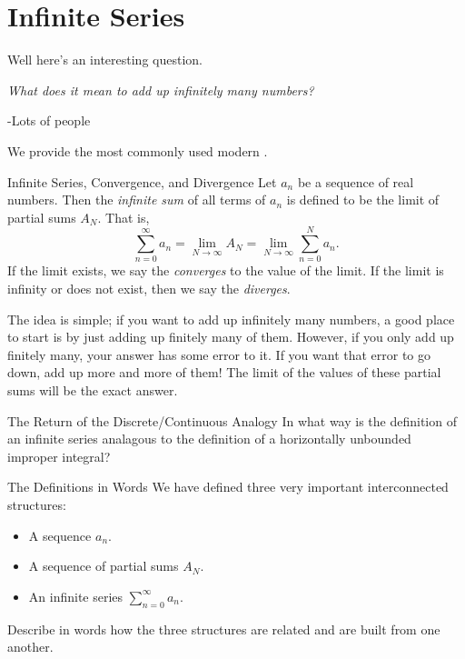 \section{Infinite Series}
Well here's an interesting question.
\begin{center}
\emph{What does it mean to add up infinitely many numbers?}

\parindent \parindent -Lots of people
\end{center}

We provide the most commonly used modern .

\begin{definition}{Infinite Series, Convergence, and Divergence}
Let $a_n$ be a sequence of real numbers.  Then the \emph{infinite sum} of all terms of $a_n$ is defined to be the limit of partial sums $A_N$.  That is, 
$$\sum_{n=0}^\infty a_n = \lim_{N\rightarrow \infty} A_N = \lim_{N\rightarrow \infty} \sum_{n=0}^N a_n. $$
If the limit exists, we say the  \emph{converges} to the value of the limit.  If the limit is infinity or does not exist, then we say the  \emph{diverges}. 
\end{definition}

The idea is simple; if you want to add up infinitely many numbers, a good place to start is by just adding up finitely many of them.  However, if you only add up finitely many, your answer has some error to it.  If you want that error to go down, add up more and more of them!  The limit of the values of these partial sums will be the exact answer.

\begin{exercise}{The Return of the Discrete/Continuous Analogy \Coffeecup \Coffeecup \Coffeecup} In what way is the definition of an infinite series analagous to the definition of a horizontally unbounded improper integral?
\vspace*{.5in}
\end{exercise}

\begin{exercise}{The Definitions in Words \Coffeecup \Coffeecup}
We have defined three very important interconnected structures: 
\begin{itemize}
\item A sequence $a_n$.
\item A sequence of partial sums $A_N$.
\item An infinite series $\sum_{n=0}^\infty a_n$.
\end{itemize}
Describe in words how the three structures are related and are built from one another.
\vspace*{1in}
 \end{exercise}
 
